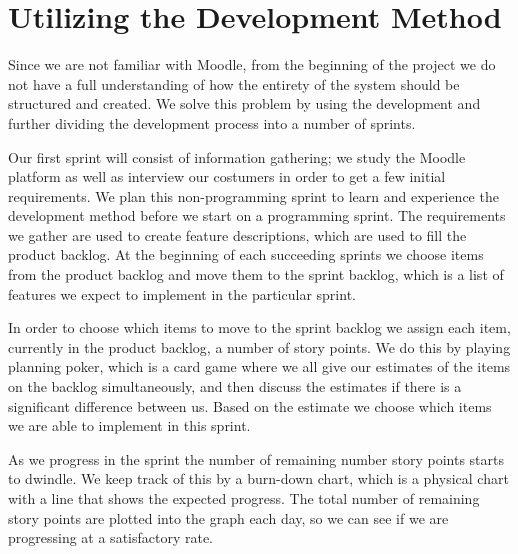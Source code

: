 \section{Utilizing the Development Method} %
Since we are not familiar with Moodle, from the beginning of the project we do not have a full understanding of how the entirety of the system should be structured and created.
We solve this problem by using the development \scrum{} and further dividing the development process into a number of sprints.


Our first sprint will consist of information gathering; we study the Moodle platform as well as interview our costumers in order to get a few initial requirements. 
We plan this non-programming sprint to learn and experience the \scrum{} development method before we start on a programming sprint.
The requirements we gather are used to create feature descriptions, which are used to fill the product backlog.
At the beginning of each succeeding sprints we choose items from the product backlog and move them to the sprint backlog, which is a list of features we expect to implement in the particular sprint.

In order to choose which items to move to the sprint backlog we assign each item, currently in the product backlog, a number of story points.
We do this by playing planning poker, which is a card game where we all give our estimates of the items on the backlog simultaneously, and then discuss the estimates if there is a significant difference between us.
Based on the estimate we choose which items we are able to implement in this sprint.

As we progress in the sprint the number of remaining number story points starts to dwindle. 
We keep track of this by a burn-down chart, which is a physical chart with a line that shows the expected progress.
The total number of remaining story points are plotted into the graph each day, so we can see if we are progressing at a satisfactory rate.

